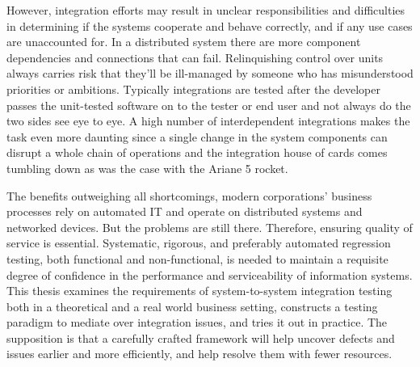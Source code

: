 \documentclass[12pt,a4paper,oneside,pdftex]{report}
\begin{document}
\begin{comment}
Automation is one of the great boons brought on by technological development on one hand freeing up resources like labour for more value-adding purposes --- and permitting the execution of uniform, repeatable processes and process control on the other. The pinnacle of advancement and prosperity on which society stands today is based on a continuous flow of various automated tasks and electronic services, many of which are complex and involve a slew of actors or agents. Work is divided and its completion therefore requires cooperation between service systems.
\end{comment}

However, integration efforts may result in unclear responsibilities and difficulties in determining if the systems cooperate and behave correctly, and if any use cases are unaccounted for. In a distributed system there are more component dependencies and connections that can fail. Relinquishing control over units always carries risk that they'll be ill-managed by someone who has misunderstood priorities or ambitions. Typically integrations are tested after the developer passes the unit-tested software on to the tester or end user and not always do the two sides see eye to eye. A high number of interdependent integrations makes the task even more daunting since a single change in the system components can disrupt a whole chain of operations and the integration house of cards comes tumbling down as was the case with the Ariane 5 rocket.

The benefits outweighing all shortcomings, modern corporations' business processes rely on automated IT and operate on distributed systems and networked devices. But the problems are still there. Therefore, ensuring quality of service is essential. Systematic, rigorous, and preferably automated regression testing, both functional and non-functional, is needed to maintain a requisite degree of confidence in the performance and serviceability of information systems. This thesis examines the requirements of system-to-system integration testing both in a theoretical and a real world business setting, constructs a testing paradigm to mediate over integration issues, and tries it out in practice. The supposition is that a carefully crafted framework will help uncover defects and issues earlier and more efficiently, and help resolve them with fewer resources.
\end{document}
